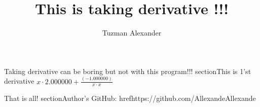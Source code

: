 \documentclass[14pt]{article}
\begin{document}
\title{This is taking derivative !!!}
\author{Tuzman Alexander}
\maketitle
Taking derivative can be boring but not with this program!!!
\newline\newline 
section{This is 1'st derivative}
$x\cdot 2.000000+\frac {(-1.000000)}{x\cdot x}$

That is all!
section{Author's GitHub:}
href{https://github.com/Allexande}{Allexande}
\end{document}
